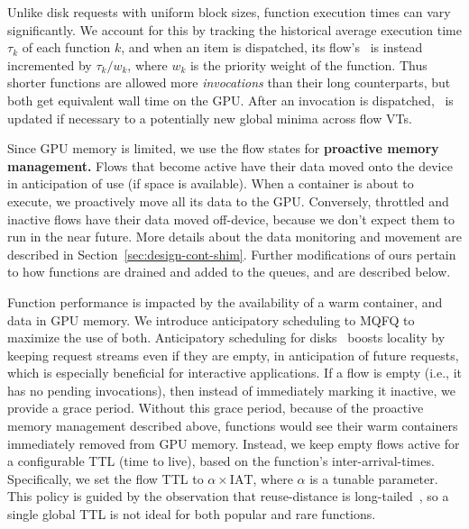 Unlike disk requests with uniform block sizes, function execution times can vary significantly.
We account for this by tracking the historical average execution time $\tau_k$ of each function $k$, and when an item is dispatched, its flow's \VT~is instead incremented by $\tau_k/w_k$, where $w_k$ is the priority weight of the function.
Thus shorter functions are allowed more \emph{invocations} than their long counterparts, but both get equivalent wall time on the GPU.
After an invocation is dispatched, \GlobVT~is updated if necessary to a potentially new global minima across flow VTs.

Since GPU memory is limited, we use the flow states for \textbf{proactive memory management.}
Flows that become active have their data moved onto the device in anticipation of use (if space is available). 
When a container is about to execute, we proactively move all its data to the GPU. 
Conversely, throttled and inactive flows have their data moved off-device, because we don't expect them to run in the near future. 
More details about the data monitoring and movement are described in Section~\ref{sec:design-cont-shim}. 
Further modifications of ours pertain to how functions are drained and added to the queues, and are described below. 

Function performance is impacted by the availability of a warm container, and data in GPU memory.  
We introduce anticipatory scheduling to MQFQ to maximize the use of both. 
Anticipatory scheduling for disks~\cite{iyer2001anticipatory} boosts locality by keeping request streams  even if they are empty, in anticipation of future requests, which is especially beneficial for interactive applications.  
If a flow is empty (i.e., it has no pending invocations), then instead of immediately marking it inactive, we provide a grace period.
Without this grace period, because of the proactive memory management described above, functions would see their warm containers immediately removed from GPU memory.
%
Instead, we keep empty flows active for a configurable TTL (time to live), based on the function's inter-arrival-times.
Specifically, we set the flow TTL to $\alpha \times \text{IAT}$, where $\alpha$ is a tunable parameter. 
This policy is guided by the observation that reuse-distance is long-tailed~\cite{faascache-asplos21}, so a single global TTL is not ideal for both popular and rare functions. 

